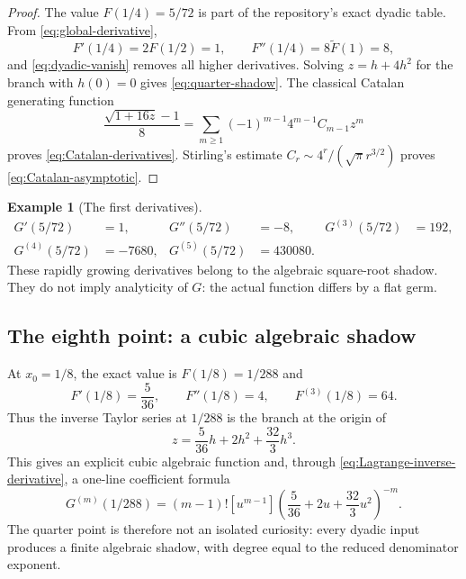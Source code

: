 \documentclass[11pt,oneside]{article}
\theoremstyle{frontier}
\theoremstyle{definition}
\newtheorem{example}[theorem]{Example}
\theoremstyle{remark}
\newcommand{\GF}{\widetilde F}
\newcommand{\InvF}{G}
\begin{document}
\begin{proof}
The value $F(1/4)=5/72$ is part of the repository's exact dyadic table.  From
\eqref{eq:global-derivative},
\[
 F'(1/4)=2F(1/2)=1,
 \qquad
 F''(1/4)=8\GF(1)=8,
\]
and \eqref{eq:dyadic-vanish} removes all higher derivatives.  Solving
$z=h+4h^2$ for the branch with $h(0)=0$ gives \eqref{eq:quarter-shadow}.  The classical Catalan
generating function
\[
 \frac{\sqrt{1+16z}-1}{8}
 =\sum_{m\ge1}(-1)^{m-1}4^{m-1}C_{m-1}z^m
\]
proves \eqref{eq:Catalan-derivatives}.  Stirling's estimate
$C_r\sim4^r/(\sqrt\pi r^{3/2})$ proves \eqref{eq:Catalan-asymptotic}.
\end{proof}

\begin{example}[The first derivatives]
\begin{align*}
 \InvF'(5/72)&=1,
 & \InvF''(5/72)&=-8,
 & \InvF^{(3)}(5/72)&=192,\\
 \InvF^{(4)}(5/72)&=-7680,
 & \InvF^{(5)}(5/72)&=430080.
\end{align*}
These rapidly growing derivatives belong to the algebraic square-root shadow.  They do not imply
analyticity of $\InvF$: the actual function differs by a flat germ.
\end{example}

\subsection{The eighth point: a cubic algebraic shadow}

At $x_0=1/8$, the exact value is $F(1/8)=1/288$ and
\begin{equation}
 F'(1/8)=\frac5{36},
 \qquad F''(1/8)=4,
 \qquad F^{(3)}(1/8)=64.
 \label{eq:eighth-jet}
\end{equation}
Thus the inverse Taylor series at $1/288$ is the branch at the origin of
\begin{equation}
 z=\frac5{36}h+2h^2+\frac{32}{3}h^3.
 \label{eq:eighth-cubic}
\end{equation}
This gives an explicit cubic algebraic function and, through
\eqref{eq:Lagrange-inverse-derivative}, a one-line coefficient formula
\begin{equation}
 \InvF^{(m)}(1/288)
 =(m-1)![u^{m-1}]
 \left(\frac5{36}+2u+\frac{32}{3}u^2\right)^{-m}.
 \label{eq:eighth-coeff}
\end{equation}
The quarter point is therefore not an isolated curiosity: every dyadic input produces a finite
algebraic shadow, with degree equal to the reduced denominator exponent.
\end{document}

